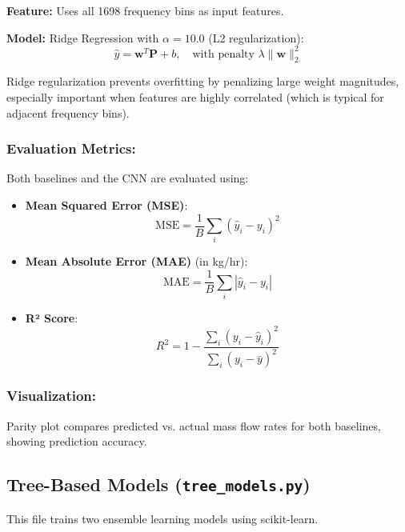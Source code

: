 \textbf{Feature:}
Uses all 1698 frequency bins as input features.

\textbf{Model:}
Ridge Regression with $\alpha = 10.0$ (L2 regularization):
\begin{equation}\label{ridge_reg}
    \hat{y} = \mathbf{w}^T \mathbf{P} + b, \quad \text{with penalty } \lambda \|\mathbf{w}\|_2^2
\end{equation}

Ridge regularization prevents overfitting by penalizing large weight magnitudes, especially important 
when features are highly correlated (which is typical for adjacent frequency bins).

\subsubsection{Evaluation Metrics:}
Both baselines and the CNN are evaluated using:
\begin{itemize}
    \item \textbf{Mean Squared Error (MSE)}: 
    \begin{equation}\label{MSE}
        \text{MSE} = \frac{1}{B}\sum_i (\hat{y}_i - y_i)^2
    \end{equation}
    \item \textbf{Mean Absolute Error (MAE)} (in kg/hr): 
    \begin{equation}\label{MAE}
        \text{MAE} = \frac{1}{B}\sum_i |\hat{y}_i - y_i|
    \end{equation}
    \item \textbf{R² Score}: 
    \begin{equation}\label{R2}
        R^2 = 1 - \frac{\sum_i (y_i - \hat{y}_i)^2}{\sum_i (y_i - \bar{y})^2}
    \end{equation}
\end{itemize}

\subsubsection{Visualization:}
Parity plot compares predicted vs. actual mass flow rates for both baselines, showing prediction accuracy.

\subsection{Tree-Based Models (\texttt{tree\_models.py})}

This file trains two ensemble learning models using scikit-learn.

